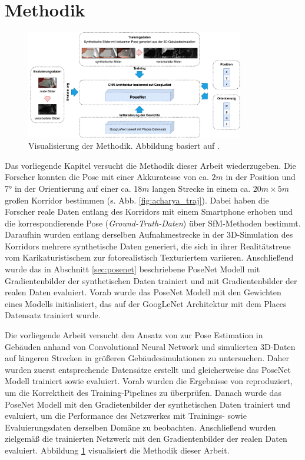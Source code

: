 
\section{Methodik}

\begin{figure}[t]
	\centering
	\includegraphics[width=0.85\textwidth]{images/methodik/methodik.pdf}
	\caption{Visualisierung der Methodik. Abbildung basiert auf \cite{acharyaBIMPoseNetIndoorCamera2019}.}
	\label{fig:methodik}
\end{figure}

Das vorliegende Kapitel versucht die Methodik dieser Arbeit wiederzugeben. Die Forscher \citet{acharyaBIMPoseNetIndoorCamera2019} konnten die Pose mit einer Akkuratesse von ca. $2m$ in der Position und 7° in der Orientierung auf einer ca. 18$m$ langen Strecke in einem ca. $20m \times 5m$ großen Korridor bestimmen (s. Abb. \ref{fig:acharya_traj}). Dabei haben die Forscher reale Daten entlang des Korridors mit einem Smartphone erhoben und die korrespondierende Pose (\textit{Ground-Truth-Daten}) über SfM-Methoden bestimmt. Daraufhin wurden entlang derselben Aufnahmestrecke in der 3D-Simulation des Korridors mehrere synthetische Daten generiert, die sich in ihrer Realitätstreue vom Karikaturistischem zur fotorealistisch Texturiertem variieren. Anschließend wurde das in Abschnitt \ref{sec:posenet} beschriebene PoseNet Modell mit Gradientenbilder der synthetischen Daten trainiert und mit Gradientenbilder der realen Daten evaluiert. Vorab wurde das PoseNet Modell mit den Gewichten eines Modells initialisiert, das auf der GoogLeNet Architektur mit dem Places Datensatz \cite{zhouLearningDeepFeatures2014} trainiert wurde. 

Die vorliegende Arbeit versucht den Ansatz von \citet{acharyaBIMPoseNetIndoorCamera2019} zur Pose Estimation in Gebäuden anhand von Convolutional Neural Network und simulierten 3D-Daten auf längeren Strecken in größeren Gebäudesimulationen zu untersuchen. Daher wurden zuerst entsprechende Datensätze erstellt und gleicherweise das PoseNet Modell trainiert sowie evaluiert. Vorab wurden die Ergebnisse von  \citet{acharyaBIMPoseNetIndoorCamera2019} reproduziert, um die Korrektheit des Training-Pipelines zu überprüfen. Danach wurde das PoseNet Modell mit den Gradietenbilder der synthetischen Daten trainiert und evaluiert, um die Performance des Netzwerkes mit Trainings- sowie Evaluierungsdaten derselben Domäne zu beobachten. Anschließend wurden zielgemäß die trainierten Netzwerk mit den Gradientenbilder der realen Daten evaluiert. Abbildung \ref{fig:methodik} visualisiert die Methodik dieser Arbeit.


